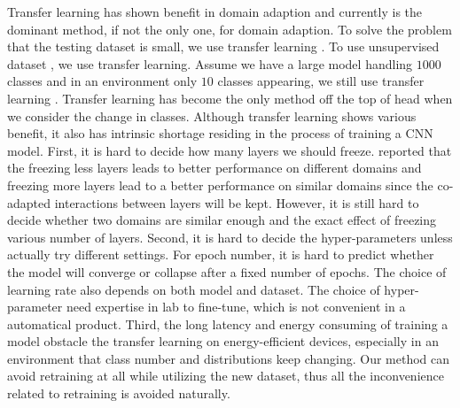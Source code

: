 \documentclass{article}
\begin{document}
Transfer learning has shown benefit in domain adaption and currently is the dominant method, if not the only one, for domain adaption. To solve the problem that the testing dataset is small, we use transfer learning \cite{oquab2014learning}. To use unsupervised dataset \cite{doersch2015unsupervised, noroozi2016unsupervised}, we use transfer learning. Assume we have a large model handling $1000$ classes and in an environment only $10$ classes appearing, we still use transfer learning \cite{han2016mcdnn, shen2017fast}. Transfer learning has become the only method off the top of head when we consider the change in classes. Although transfer learning shows various benefit, it also has intrinsic shortage residing in the process of training a CNN model. First, it is hard to decide how many layers we should freeze. \cite{yosinski2014transferable} reported that the freezing less layers leads to better performance on different domains and freezing more layers lead to a better performance on similar domains since the co-adapted interactions between layers will be kept. However, it is still hard to decide whether two domains are similar enough and the exact effect of freezing various number of layers. Second, it is hard to decide the hyper-parameters unless actually try different settings. For epoch number, it is hard to predict whether the model will converge or collapse after a fixed number of epochs. The choice of learning rate also depends on both model and dataset. The choice of hyper-parameter need expertise in lab to fine-tune, which is not convenient in a automatical product. Third, the long latency and energy consuming of training a model obstacle the transfer learning on energy-efficient devices, especially in an environment that class number and distributions keep changing. Our method can avoid retraining at all while utilizing the new dataset, thus all the inconvenience related to retraining is avoided naturally.
\end{document}
